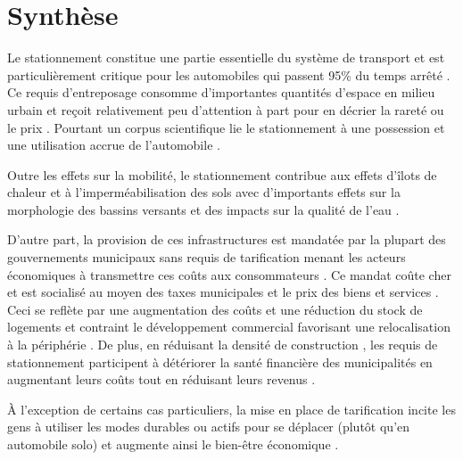 \section{Synthèse}\label{sec:synthese-rev-litt}  
    Le stationnement constitue une partie essentielle du système de transport et est particulièrement critique pour les automobiles qui passent 95\% du temps arrêté \parencite{morency_identification_2015}. Ce requis d'entreposage consomme d'importantes quantités d'espace en milieu urbain \parencite{chester_inventorying_2022,heran_consommation_2008} et reçoit relativement peu d'attention \parencite{shoup_high_2005,inci_review_2015} à part pour en décrier la rareté ou le prix \parencite{de_borger_political_2017}. Pourtant un corpus scientifique lie le stationnement à une possession et une utilisation accrue  de l'automobile \parencite{christiansen_parking_2017,currans_households_2023}. \par 
    Outre les effets sur la mobilité, le stationnement contribue aux effets d'îlots de chaleur \parencite{hoehne_urban_2022,isola_urban_2024} et à l'imperméabilisation des sols \parencite{arnold_jr_impervious_1996} avec d'importants effets sur la morphologie des bassins versants \parencite{shaikh_impacts_2023} et des impacts sur la qualité de l'eau \parencite{muller_pollution_2020}. \par
    D'autre part, la provision de ces infrastructures est mandatée par la plupart des gouvernements municipaux sans requis de tarification menant les acteurs économiques à transmettre ces coûts aux consommateurs \parencite{shoup_high_2005}. Ce mandat coûte cher et est socialisé au moyen des taxes municipales et le prix des biens et services \parencite{shoup_high_2005}. Ceci se reflète par une augmentation des coûts \parencite{gabbe_hidden_2017} et une réduction du stock de logements \parencite{shah_impact_2024,anderson_economics_2004,lehe_how_2018} et contraint le développement commercial favorisant une relocalisation à la périphérie \parencite{cutter_parking_2012}. De plus, en réduisant la densité de construction \parencite{shoup_high_2005,smith_low-rise_1964}, les requis de stationnement participent à détériorer la santé financière des municipalités en augmentant leurs coûts \parencite{hortas-rico_does_2010,metro_vancouver_regional_planning_cost_2023} tout en réduisant leurs revenus \parencite{blanc_effects_2014}.\par
    À l'exception de certains cas particuliers, la mise en place de tarification incite les gens à utiliser les modes durables ou actifs pour se déplacer (plutôt qu'en automobile solo) et augmente ainsi le bien-être économique \parencite{khordagui_commute_2019,olus_inan_spillover_2019}. 
